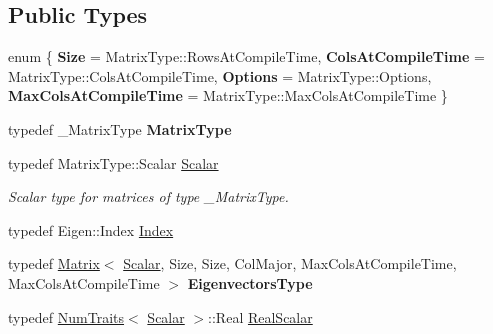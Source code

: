 \subsection*{Public Types}
\begin{DoxyCompactItemize}
\item 
\mbox{\label{class_eigen_1_1_self_adjoint_eigen_solver_acc24735d7689d99d676919af513156d9}} 
enum \{ {\bfseries Size} = Matrix\+Type\+::Rows\+At\+Compile\+Time, 
{\bfseries Cols\+At\+Compile\+Time} = Matrix\+Type\+::Cols\+At\+Compile\+Time, 
{\bfseries Options} = Matrix\+Type\+::Options, 
{\bfseries Max\+Cols\+At\+Compile\+Time} = Matrix\+Type\+::Max\+Cols\+At\+Compile\+Time
 \}
\item 
\mbox{\label{class_eigen_1_1_self_adjoint_eigen_solver_aa8238634587d40c56228848470acb4ef}} 
typedef \+\_\+\+Matrix\+Type {\bfseries Matrix\+Type}
\item 
\mbox{\label{class_eigen_1_1_self_adjoint_eigen_solver_a0bfcedf4245b6846007ca4f01e4feb1f}} 
typedef Matrix\+Type\+::\+Scalar \mbox{\hyperlink{class_eigen_1_1_self_adjoint_eigen_solver_a0bfcedf4245b6846007ca4f01e4feb1f}{Scalar}}
\begin{DoxyCompactList}\small\item\em Scalar type for matrices of type {\ttfamily \+\_\+\+Matrix\+Type}. \end{DoxyCompactList}\item 
typedef Eigen\+::\+Index \mbox{\hyperlink{class_eigen_1_1_self_adjoint_eigen_solver_a8a59ab7734b6eae2754fd78bc7c3a360}{Index}}
\item 
\mbox{\label{class_eigen_1_1_self_adjoint_eigen_solver_a0cbb16dc8baf4058188ea308fa37a803}} 
typedef \mbox{\hyperlink{class_eigen_1_1_matrix}{Matrix}}$<$ \mbox{\hyperlink{class_eigen_1_1_self_adjoint_eigen_solver_a0bfcedf4245b6846007ca4f01e4feb1f}{Scalar}}, Size, Size, Col\+Major, Max\+Cols\+At\+Compile\+Time, Max\+Cols\+At\+Compile\+Time $>$ {\bfseries Eigenvectors\+Type}
\item 
typedef \mbox{\hyperlink{struct_eigen_1_1_num_traits}{Num\+Traits}}$<$ \mbox{\hyperlink{class_eigen_1_1_self_adjoint_eigen_solver_a0bfcedf4245b6846007ca4f01e4feb1f}{Scalar}} $>$\+::Real \mbox{\hyperlink{class_eigen_1_1_self_adjoint_eigen_solver_a5dae5f422a3c71060e6bd31332bf64fd}{Real\+Scalar}}

\end{DoxyCompactItemize}
